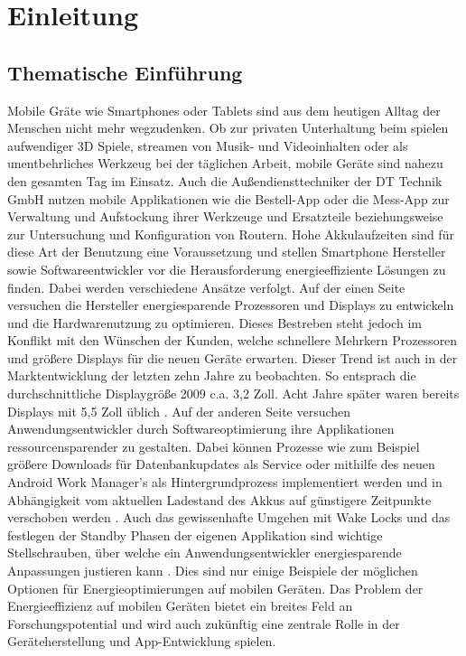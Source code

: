 \chapter{Einleitung}
\section{Thematische Einführung}
Mobile Gräte wie Smartphones oder Tablets sind aus dem heutigen Alltag der Menschen nicht mehr wegzudenken. Ob zur privaten Unterhaltung beim spielen aufwendiger 3D Spiele, streamen von Musik- und Videoinhalten oder als unentbehrliches Werkzeug bei der täglichen Arbeit, mobile Geräte sind nahezu den gesamten Tag im Einsatz. Auch die Außendiensttechniker der DT Technik GmbH nutzen mobile Applikationen wie die Bestell-App oder die Mess-App zur Verwaltung und Aufstockung ihrer Werkzeuge und Ersatzteile beziehungsweise zur Untersuchung und Konfiguration von Routern. Hohe Akkulaufzeiten sind für diese Art der Benutzung eine Voraussetzung und stellen Smartphone Hersteller sowie Softwareentwickler vor die Herausforderung energieeffiziente Lösungen zu finden.
Dabei werden verschiedene Ansätze verfolgt. Auf der einen Seite versuchen die Hersteller energiesparende Prozessoren und Displays zu entwickeln und die Hardwarenutzung zu optimieren. Dieses Bestreben steht jedoch im Konflikt mit den Wünschen der Kunden, welche schnellere Mehrkern Prozessoren und größere Displays für die neuen Geräte erwarten. Dieser Trend ist auch in der Marktentwicklung der letzten zehn Jahre zu beobachten. So entsprach die durchschnittliche Displaygröße 2009 c.a. 3,2 Zoll. Acht Jahre später waren bereits Displays mit 5,5 Zoll üblich \cite{DisplayGroesse}. Auf der anderen Seite versuchen Anwendungsentwickler durch Softwareoptimierung ihre Applikationen ressourcensparender zu gestalten. Dabei können Prozesse wie zum Beispiel größere Downloads für Datenbankupdates als Service oder mithilfe des neuen Android Work Manager's als Hintergrundprozess implementiert werden und in Abhängigkeit vom aktuellen Ladestand des Akkus auf günstigere Zeitpunkte verschoben werden \cite{WorkManager}. Auch das gewissenhafte Umgehen mit Wake Locks und das festlegen der Standby Phasen der eigenen Applikation sind wichtige Stellschrauben, über welche ein Anwendungsentwickler energiesparende Anpassungen justieren kann \cite{WakeLocks}. Dies sind nur einige Beispiele  der möglichen Optionen für Energieoptimierungen auf mobilen Geräten. Das Problem der Energieeffizienz auf mobilen Geräten bietet ein breites Feld an Forschungspotential und wird auch zukünftig eine zentrale Rolle in der Geräteherstellung und App-Entwicklung spielen.

